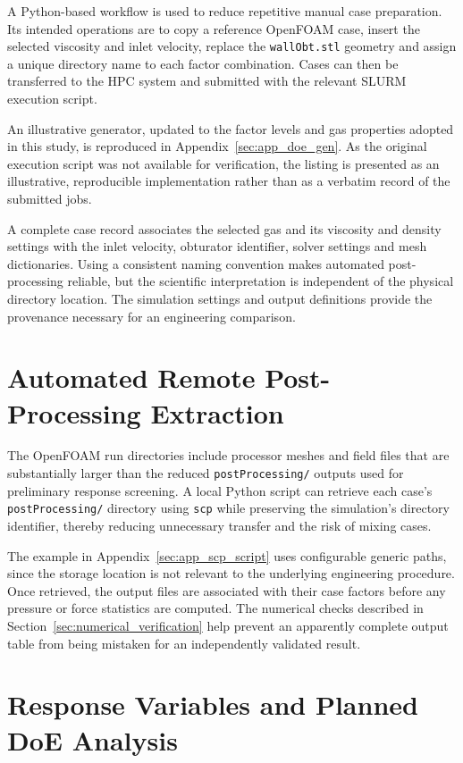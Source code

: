 A Python-based workflow is used to reduce repetitive manual case preparation. Its intended operations are to copy a reference OpenFOAM case, insert the selected viscosity and inlet velocity, replace the \texttt{wallObt.stl} geometry and assign a unique directory name to each factor combination. Cases can then be transferred to the HPC system and submitted with the relevant SLURM execution script.

An illustrative generator, updated to the factor levels and gas properties adopted in this study, is reproduced in Appendix~\ref{sec:app_doe_gen}. As the original execution script was not available for verification, the listing is presented as an illustrative, reproducible implementation rather than as a verbatim record of the submitted jobs.

A complete case record associates the selected gas and its viscosity and density settings with the inlet velocity, obturator identifier, solver settings and mesh dictionaries. Using a consistent naming convention makes automated post-processing reliable, but the scientific interpretation is independent of the physical directory location. The simulation settings and output definitions provide the provenance necessary for an engineering comparison.

\section{Automated Remote Post-Processing Extraction}
\label{sec:scp_extraction}

The OpenFOAM run directories include processor meshes and field files that are substantially larger than the reduced \texttt{postProcessing/} outputs used for preliminary response screening. A local Python script can retrieve each case's \texttt{postProcessing/} directory using \texttt{scp} while preserving the simulation's directory identifier, thereby reducing unnecessary transfer and the risk of mixing cases.

The example in Appendix~\ref{sec:app_scp_script} uses configurable generic paths, since the storage location is not relevant to the underlying engineering procedure. Once retrieved, the output files are associated with their case factors before any pressure or force statistics are computed. The numerical checks described in Section~\ref{sec:numerical_verification} help prevent an apparently complete output table from being mistaken for an independently validated result.

\section{Response Variables and Planned DoE Analysis}
\label{sec:doe_analysis}

